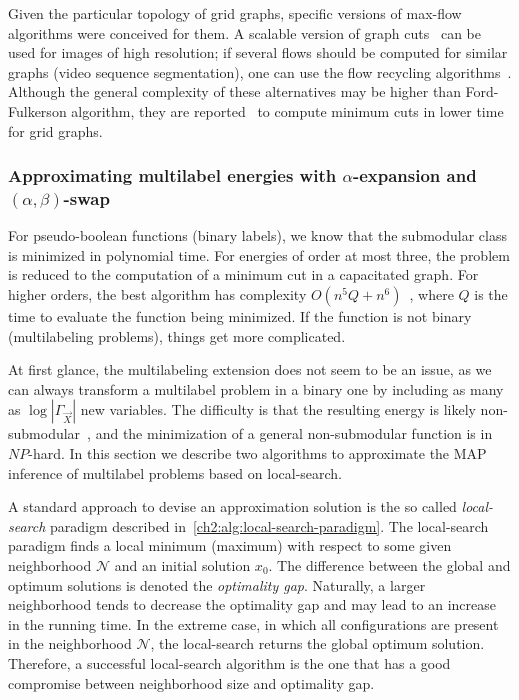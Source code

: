 Given the particular topology of grid graphs, specific versions of max-flow algorithms were conceived for them. A scalable version of graph cuts~\cite{delong08scalable} can be used for images of high resolution; if several flows should be computed for similar graphs (video sequence segmentation), one can use the flow recycling algorithms~\cite{kohli05efficiently,juan06active}. Although the general complexity of these alternatives may be higher than Ford-Fulkerson algorithm, they are reported~\cite{szeliski06comparative} to compute minimum cuts in lower time for grid graphs.


\subsubsection{Approximating multilabel energies with $\alpha$-expansion and $(\alpha,\beta)$-swap}

For pseudo-boolean functions (binary labels), we know that the submodular class is minimized in polynomial time. For energies of order at most three, the problem is reduced to the computation of a minimum cut in a capacitated graph. For higher orders, the best algorithm has complexity $O(n^5Q + n^6)$~\cite{orlin09faster}, where $Q$ is the time to evaluate the function being minimized. If the function is not binary (multilabeling problems), things get more complicated.

At first glance, the multilabeling extension does not seem to be an issue, as we can always transform a multilabel problem in a binary one by including as many as $\log |\Gamma_{\vec{X}}|$ new variables. The difficulty is that the resulting energy is likely  non-submodular~\cite{ramalingam08}, and the minimization of a general non-submodular function is in $NP$-hard. In this section we describe two algorithms to approximate the MAP inference of multilabel problems based on local-search.

A standard approach to devise an approximation solution is the so called \emph{local-search} paradigm described in~\cref{ch2:alg:local-search-paradigm}. The local-search paradigm finds a local minimum (maximum) with respect to some given neighborhood $\mathcal{N}$ and an initial solution $x_0$. The difference between the global and optimum solutions is denoted the \emph{optimality gap}. Naturally, a larger neighborhood tends to decrease the optimality gap and may lead to an increase in the running time. In the extreme case, in which all configurations are present in the neighborhood $\mathcal{N}$, the local-search returns the global optimum solution. Therefore, a successful local-search algorithm is the one that has a good compromise between neighborhood size and optimality gap.

